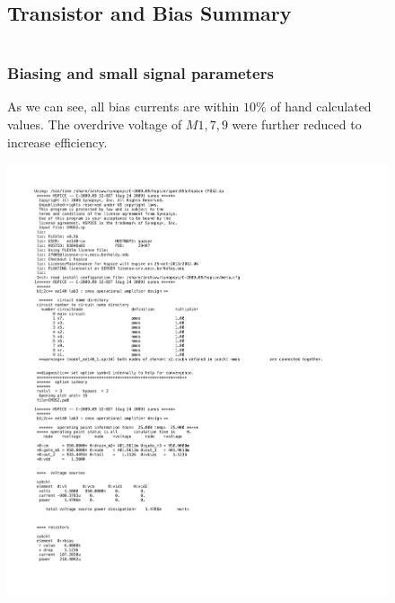 \documentclass[]{article}
\begin{document}
		\begin{figure}
			\subsection{Transistor and Bias Summary}
				$$$$
				\subsubsection{Biasing and small signal parameters}
				As we can see, all bias currents are within $10\%$ of hand calculated values. The overdrive voltage of $M1,7,9$ were further reduced to increase efficiency.
				
				\includegraphics[width=1.25\textwidth]{OPERATING_POINT_FINAL.pdf}
		\end{figure}
		
\end{document}
